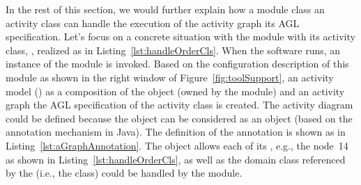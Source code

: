 In the rest of this section, we would further explain how a module class \wrt an activity class can handle the execution of the activity graph \wrt its AGL specification. Let's focus on a concrete situation with the   module with its activity class, , realized as in Listing~\ref{lst:handleOrderCls}. %
%
When the software runs, an instance of the  module is invoked. Based on the configuration description of this module as shown in the right window of Figure~\ref{fig:toolSupport}, an activity model () as a composition of the  object (owned by the  module) and an activity graph \wrt the AGL specification of the activity class  is created. The activity diagram could be defined because the  object can be considered as an  object (based on the annotation mechanism in Java). The definition of the annotation  is shown as in Listing~\ref{lst:aGraphAnnotation}. 
%
The  object allows each of its , e.g., the  \wrt node~14 as shown in Listing~\ref{lst:handleOrderCls}, as well as the domain class referenced by the  (i.e., the  class) could be handled by the  module. 


























 